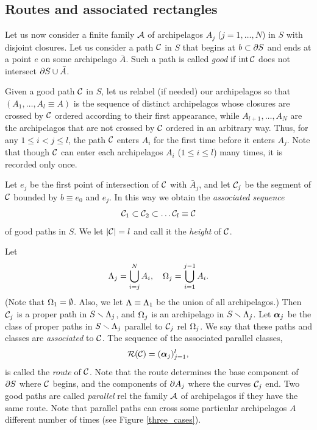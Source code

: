 \subsection{Routes and associated rectangles}\label{routes}
  Let us now consider  a finite family ${\cal A}$ of archipelagos $A_j$ ($j=1,\dots, N$)
in $S$ with disjoint closures. 
Let us consider a path ${\cal C}$  in $S$ that begins at $b\subset \partial S$
and ends at  a point $e$ on some archipelago $\bar A $. 
Such a path is called {\it good} if $\operatorname{int} {\cal C}$ does not intersect $\partial S\cup \bar A$.

Given a good path ${\cal C}$ in $S$, let us relabel (if needed) our archipelagos so that
$( A_1, \dots,  A_l\equiv A )$ is the sequence of distinct archipelagos whose closures are crossed by ${\cal C}$
ordered according to their first appearance, while  $A_{l+1}, \dots, A_N$ are the archipelagos
that are not crossed by ${\cal C}$ ordered in an arbitrary way. 
Thus, for any $1\leq i<j \leq l$,  the  path ${\cal C}$ enters $A_i$ for the first time before it enters $A_j$.  
Note that though ${\cal C}$ can enter each archipelagos $A_i$ ($1\leq i\leq l$)
many times, it is recorded only once. 

Let $e_j$ be the first point of intersection of ${\cal C}$ with $\bar A_j$, and let 
${\cal C}_j$ be the segment of ${\cal C}$ bounded by $b\equiv e_0$ and $e_j$.  
In this way we obtain the {\it associated sequence}
$${\cal C}_1\subset {\cal C}_2\subset \dots  {\cal C}_l\equiv {\cal C} $$ 
of good paths in $S$.
We let   $|{\cal C}| =l$ and call it   the {\it height}  of  ${\cal C}$.

Let 
$$ 
       {\Lambda}_j= \bigcup_{i=j}^N A_i, \quad   {\Omega}_j = \bigcup_{i=1}^{j-1} A_i. 
$$ 
(Note that ${\Omega}_1=\emptyset$. Also, we let ${\Lambda}\equiv {\Lambda}_1$ be the union of all archipelagos.)
Then ${\cal C}_j$ is a proper path in $S\smallsetminus {\Lambda}_j$, 
and ${\Omega}_j$  is an archipelago in $ S\smallsetminus {\Lambda}_j$.   
Let ${\mbox{\boldmath$\alpha$} }_j$ be the class of proper paths in $S\smallsetminus {\Lambda}_j$ parallel to ${\cal C}_j$ rel ${\Omega}_j$. 
We say that these paths and classes are  {\it associated} to ${\cal C}$.
The sequence of the associated parallel classes,
$$
  {\cal R}({\cal C})= ({\mbox{\boldmath$\alpha$} }_j)_{j=1}^l,
$$
is called the {\it route} of ${\cal C}$. Note that the route determines the base component  of $\partial S$ 
where ${\cal C}$ begins,  
and  the components of  $\partial A_j$ where the curves ${\cal C}_j$ end.
Two good paths are called {\it parallel} rel the family ${\cal A}$ of archipelagos  if they have the same route.
Note that parallel paths can cross some particular archipelagos $A$ different number of times
(see Figure \ref{three_cases}). 


